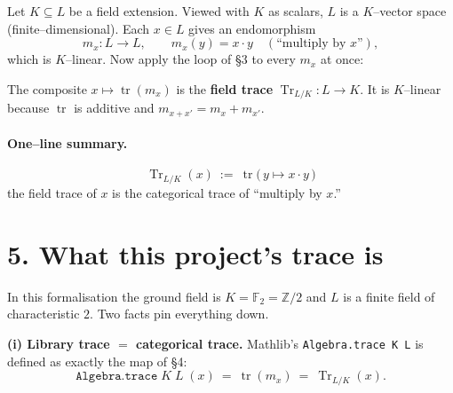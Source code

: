 \documentclass[11pt]{article}
\newcommand{\Tr}{\operatorname{Tr}}
\newcommand{\tr}{\operatorname{tr}}
\begin{document}
\medskip
\noindent Let $K\subseteq L$ be a field extension. Viewed with $K$ as scalars,
$L$ is a $K$--vector space (finite--dimensional). Each $x\in L$ gives an
endomorphism
\[
m_x\colon L\to L,\qquad m_x(y)=x\cdot y \quad(\text{``multiply by }x\text{''}),
\]
which is $K$--linear. Now apply the loop of \S3 to every $m_x$ at once:

\begin{center}
\end{center}

The composite $x\mapsto \tr(m_x)$ is the \textbf{field trace}
$\Tr_{L/K}\colon L\to K$. It is $K$--linear because $\tr$ is additive and
$m_{x+x'}=m_x+m_{x'}$.

\begin{center}
\end{center}

\paragraph{One--line summary.}
\[
\boxed{\;\Tr_{L/K}(x)\ :=\ \tr\big(\,y\mapsto x\cdot y\,\big)\;}
\]
the field trace of $x$ is the categorical trace of ``multiply by $x$.''

\section*{5. What this project's trace is}

In this formalisation the ground field is $K=\mathbb{F}_2=\mathbb{Z}/2$ and $L$
is a finite field of characteristic $2$. Two facts pin everything down.

\medskip
\noindent\textbf{(i) Library trace $=$ categorical trace.}
Mathlib's \texttt{Algebra.trace K L} is defined as exactly the map of \S4:
\[
\texttt{Algebra.trace}\;K\;L\;(x)\ =\ \tr(m_x)\ =\ \Tr_{L/K}(x).
\]
\end{document}
